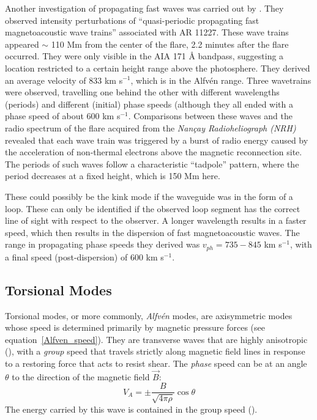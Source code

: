 \documentclass[preprint2]{aastex}
\begin{document}

Another investigation of propagating fast waves was carried out by
\cite{pfw_2}.
They observed intensity perturbations of ``quasi-periodic propagating fast
magnetoacoustic wave trains'' associated with AR 11227.
These wave trains appeared $\sim$ 110 Mm from the center of the flare,
2.2 minutes after the flare occurred.
They were only visible in the AIA 171 \AA{} bandpass, suggesting a
location restricted to a certain height range above the photosphere.
They derived an average velocity of
833 km s$^{-1}$, which is in the Alfv\'en range.
Three wavetrains were observed, travelling one behind the other
with different wavelengths (periods) and different (initial) phase
speeds (although they all ended with a phase speed of about 600 km s$^{-1}$.
Comparisons between these waves and the radio spectrum of the flare
acquired from the \emph{Nan\c{c}ay Radioheliograph (NRH)}
revealed that each wave train was triggered by a burst of radio energy
caused by the acceleration of non-thermal electrons above the
magnetic reconnection site. The periods of such waves follow a
characteristic ``tadpole'' pattern, where the period decreases at
a fixed height, which is 150 Mm here.

These could possibly be the kink mode if the waveguide was in
the form of a loop. These can only be identified if the observed loop
segment has the correct line of sight with respect to the observer.
A longer wavelength results in a faster speed, which then results
in the dispersion of fast magnetoacoustic waves. The range in
propagating phase speeds they derived was
$ v_{ph} = 735 - 845 $ km s$^{-1}$, with a final speed
(post-dispersion) of 600 km s$^{-1}$.

\subsection{Torsional Modes}
Torsional modes, or more commonly, \emph{Alfv\'en} modes, are axisymmetric
modes whose speed is determined primarily by magnetic pressure forces
(see equation~\ref{Alfven_speed}).
They are transverse waves that are highly anisotropic (\cite{Goossens}),
with a \emph{group} speed that
travels strictly along magnetic field lines in response
to a restoring force that acts to resist shear.
The \emph{phase} speed can be at an angle $\theta$ to the direction
of the magnetic field $\vec{B}$:
\begin{equation}
    V_A = \pm \frac{B}{\sqrt{4\pi\rho}}\cos\theta
\end{equation}
The energy carried by this wave is contained in the group speed
(\cite{Somov}).
\end{document}
